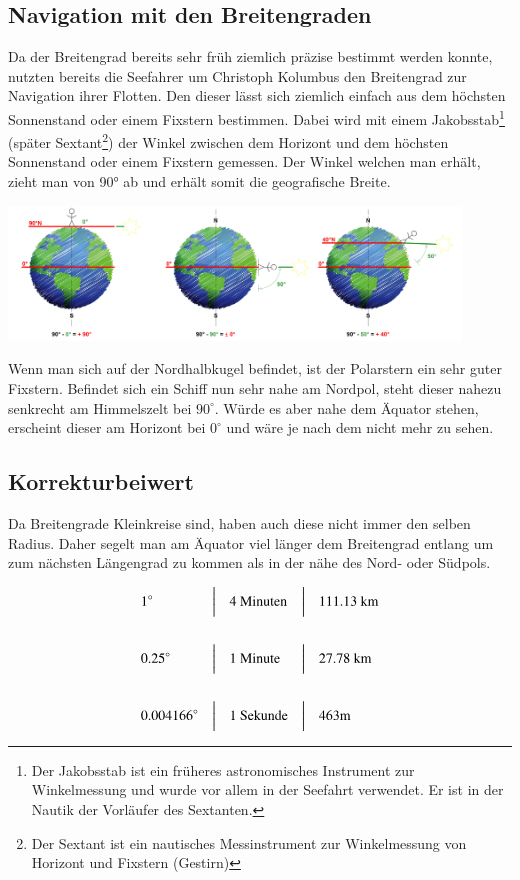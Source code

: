 \begin{refsection}
\subsection{Navigation mit den Breitengraden}  \label{BreitengradM}
Da der Breitengrad bereits sehr früh ziemlich präzise bestimmt werden konnte, nutzten bereits die Seefahrer um Christoph Kolumbus den Breitengrad zur Navigation ihrer Flotten.
Den dieser lässt sich ziemlich einfach aus dem höchsten Sonnenstand oder einem Fixstern bestimmen. Dabei wird mit einem Jakobsstab\footnote{%
Der Jakobsstab ist ein früheres astronomisches Instrument zur Winkelmessung und wurde vor allem in der Seefahrt verwendet. Er ist in der Nautik der Vorläufer des Sextanten.} (später Sextant\footnote{%
Der Sextant ist ein nautisches Messinstrument zur Winkelmessung von Horizont und Fixstern (Gestirn)}) der Winkel zwischen dem Horizont und dem höchsten Sonnenstand oder einem Fixstern gemessen. Der Winkel welchen man erhält, zieht man von 90° ab und erhält somit die geografische Breite. 

\begin{center}
        \includegraphics[width=0.9\textwidth]{kugel/Breitengrad.jpg}
\end{center}

Wenn man sich auf der Nordhalbkugel befindet, ist der Polarstern ein sehr guter Fixstern. Befindet sich ein Schiff nun sehr nahe am Nordpol, steht dieser nahezu senkrecht am Himmelszelt bei $90^{\circ}$. Würde es aber nahe dem Äquator stehen, erscheint dieser am Horizont bei $0^{\circ}$ und wäre je nach dem nicht mehr zu sehen.


\subsection{Korrekturbeiwert}
Da Breitengrade Kleinkreise sind, haben auch diese nicht immer den selben Radius. Daher segelt man am Äquator viel länger dem Breitengrad entlang um zum nächsten Längengrad zu kommen als in der nähe des Nord- oder Südpols.

\[
\begin{aligned}
&\text{1}^{\circ}
&
&\text{\bigg \vert}
&
&\text{4 Minuten}
&
&\text{\bigg \vert}
&
&\text{111.13 km}
\\
\\
&\text{0.25}^{\circ}
&
&\text{\bigg \vert}
&
&\text{1 Minute}
&
&\text{\bigg \vert}
&
&\text{27.78 km}
\\
\\
&\text{0.004166}^{\circ}
&
&\text{\bigg \vert}
&
&\text{1 Sekunde}
&
&\text{\bigg \vert}
&
&\text{463m}
\end{aligned}
\]


\end{refsection}
